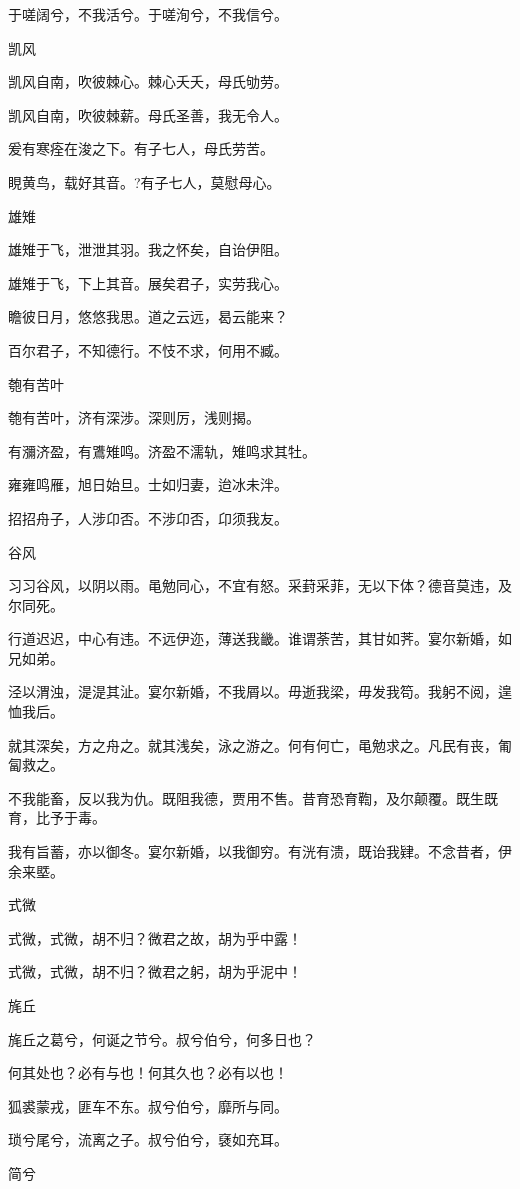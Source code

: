 于嗟阔兮，不我活兮。于嗟洵兮，不我信兮。

凯风

凯风自南，吹彼棘心。棘心夭夭，母氏劬劳。

凯风自南，吹彼棘薪。母氏圣善，我无令人。

爰有寒痊在浚之下。有子七人，母氏劳苦。

睍黄鸟，载好其音。?有子七人，莫慰母心。

雄雉

雄雉于飞，泄泄其羽。我之怀矣，自诒伊阻。

雄雉于飞，下上其音。展矣君子，实劳我心。

瞻彼日月，悠悠我思。道之云远，曷云能来？

百尔君子，不知德行。不忮不求，何用不臧。

匏有苦叶

匏有苦叶，济有深涉。深则厉，浅则揭。

有瀰济盈，有鷕雉鸣。济盈不濡轨，雉鸣求其牡。

雍雍鸣雁，旭日始旦。士如归妻，迨冰未泮。

招招舟子，人涉卬否。不涉卬否，卬须我友。

谷风

习习谷风，以阴以雨。黾勉同心，不宜有怒。采葑采菲，无以下体？德音莫违，及尔同死。

行道迟迟，中心有违。不远伊迩，薄送我畿。谁谓荼苦，其甘如荠。宴尔新婚，如兄如弟。

泾以渭浊，湜湜其沚。宴尔新婚，不我屑以。毋逝我梁，毋发我笱。我躬不阅，遑恤我后。

就其深矣，方之舟之。就其浅矣，泳之游之。何有何亡，黾勉求之。凡民有丧，匍匐救之。

不我能畜，反以我为仇。既阻我德，贾用不售。昔育恐育鞫，及尔颠覆。既生既育，比予于毒。

我有旨蓄，亦以御冬。宴尔新婚，以我御穷。有洸有溃，既诒我肄。不念昔者，伊余来塈。

式微

式微，式微，胡不归？微君之故，胡为乎中露！

式微，式微，胡不归？微君之躬，胡为乎泥中！

旄丘

旄丘之葛兮，何诞之节兮。叔兮伯兮，何多日也？

何其处也？必有与也！何其久也？必有以也！

狐裘蒙戎，匪车不东。叔兮伯兮，靡所与同。

琐兮尾兮，流离之子。叔兮伯兮，褎如充耳。

简兮

